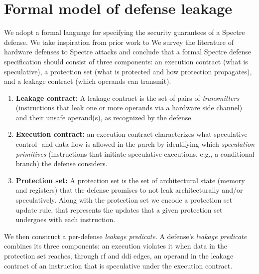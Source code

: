 \section{Formal model of defense leakage} \label{formalmodel}
We adopt a formal language for specifying the security guarantees of a  Spectre defense.
We take inspiration from prior work to 
We survey the literature of hardware defenses to Spectre attacks and conclude that a formal Spectre defense specification should consist of three components: an execution contract (what is speculative), a protection set (what is protected and how protection propagates), and a leakage contract (which operands can transmit).
\begin{enumerate}
    \item \textbf{Leakage contract:}
A leakage contract is the set of pairs of \textit{transmitters} (instructions that leak one or more operands via a hardware side channel) and their unsafe operand(s), as recognized by the defense.
\item \textbf{Execution contract:} 
an execution contract characterizes what speculative control- and data-flow is allowed in the $\mu$arch by identifying which \textit{speculation primitives} (instructions that initiate speculative executions, e.g., a conditional branch) the defense considers. 
\item \textbf{Protection set:}
A protection set is the set of architectural state (memory and registers) that the defense promises to not leak architecturally and/or speculatively. Along with the protection set we encode a protection set update rule, that represents the updates that a given protection set undergoes with each instruction.
\end{enumerate}
We then construct a per-defense \textit{leakage predicate}.
A defense's \emph{leakage predicate} combines its three components: an execution violates it when data in the protection set reaches, through rf and ddi edges, an operand in the leakage contract of an instruction that is speculative under the execution contract.

